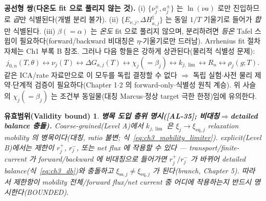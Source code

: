\documentclass[11pt,a4paper]{article}
\newtheorem*{boundbox}{유효범위(Validity bound)}
\newcommand{\eq}{\mathrm{eq}}
\newcommand{\sstat}{\mathrm{ss}}
\newcommand{\AL}[1]{\textsf{[AL-#1]}}
\begin{document}
\textbf{공선형 쌍(다온도 fit 으로 풀리지 않는 것).} (i) $\{\nu_j^\pm,a_j^\pm\}$ 는 $\ln(\nu a)$ 로만 진입하므로
\emph{곱}만 식별된다(개별 분리 불가). (ii) $\{E_{\nu,j},\Delta H_{a,j}^\ddagger\}$ 는 동일 $1/T$ 기울기로
들어가 \emph{합}만 식별된다. (iii) $\beta(=\alpha)$ 는 \emph{온도} fit 으로 풀리지 않으며, 분리하려면 \emph{등온}
Tafel 스윕이 필요하다(forward/backward 비대칭은 $\eta$-기울기로만 드러남). Arrhenius fit 절차 자체는 Ch1 부록 B
참조. 그러나 다음 항들은 강하게 상관된다(물리적 식별성 문제):
\begin{equation}
j_{0,n}(T,\theta)\leftrightarrow\nu_j(T)\leftrightarrow\Delta G_{a,j}(T)\leftrightarrow\chi_j(=\beta_j)\leftrightarrow k_{j,\lim}\leftrightarrow R_n\leftrightarrow\rho_j(g;T).
\label{eq:ch3_ident_chain}
\end{equation}
같은 ICA/rate 자료만으로 이 모두를 독립 결정할 수 없다 $\Rightarrow$ 독립 실험$\cdot$사전 물리 제약$\cdot$단계적
검증이 필요하다(Chapter 1$\cdot$2 의 forward-only$\cdot$식별성 원칙 계승). 위 사슬의 $\chi_j(=\beta_j)$ 는
조건부 동일물(대칭 Marcus$\cdot$정상 target 극한 한정)임에 유의한다.
\begin{boundbox}
\textbf{병목 도입 층위 명시(\AL{35}; 비대칭$\Rightarrow$detailed balance 충돌).} Coarse-grained(Level A)에서
$k_{j,\lim}$ 은 $\xi_j\to\xi_{\eq,j}$ relaxation mobility 의 병목이다(대칭, ratio 불변; 식~\eqref{eq:ch3_mobility_limiter}).
explicit(Level B)에서는
제한이 $r_j^+$, $r_j^-$, 또는 net flux 에 작용할 수 있다 — transport/finite-current 가 forward/backward 에
\emph{비대칭}으로 들어가면 $r_j^+/r_j^-$ 가 바뀌어 detailed balance(식~\eqref{eq:ch3_db})와 충돌하고
$\xi_{\sstat,j}\ne\xi_{\eq,j}$ 가 된다(branch, Chapter 5). 따라서 제한항이 mobility 전체/forward flux/net current
중 \emph{어디}에 작용하는지 반드시 명시한다(BOUNDED).
\end{boundbox}

\end{document}
